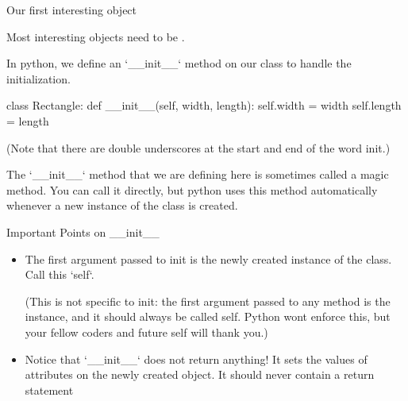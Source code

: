 \documentclass[aspectratio=149] {beamer}
\begin{document}
\begin{frame}[fragile]{Our first interesting object}

  Most interesting objects need to be .

  \pause \medskip

  In python, we define an \inline`__init__` 
  method on our class to handle the initialization.

  \pause \medskip

  \begin{pythoncode}
  class Rectangle:
      def __init__(self, width, length):
          self.width = width
          self.length = length
        
  \end{pythoncode}

  (Note that there are double underscores at the start and end of the word init.)

  \medskip

  The \inline`__init__` method that we are defining here is sometimes called a magic method.  You can call it directly, but python uses this method automatically whenever a new instance of the class is created.
\end{frame}


\begin{frame}[fragile]{Important Points on \_\_init\_\_}

  \begin{itemize}

    \item The first argument passed to init is the newly created instance of the class. Call this \inline`self`.  

    (This is not specific to init: the first argument passed to any method is the instance, and it should always be called self. Python wont enforce this, but your fellow coders and future self will thank you.)

    \bigskip

    \item Notice that \inline`__init__` does not return anything!  It sets the values of attributes on the newly created object.  It should never contain a return statement
  \end{itemize}

\end{frame}
\end{document}
